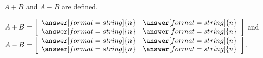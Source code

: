 \documentclass{ximera}
\begin{document}
\begin{exercise}
\begin{enumerate}
    $A+B$ and $A-B$ are  defined.

    $A + B = \startmat{rr}
      \answer[format=string]{n} & \answer[format=string]{n} \\
      \answer[format=string]{n} & \answer[format=string]{n}
    \stopmat$
    and $A - B = \startmat{rr}
      \answer[format=string]{n} & \answer[format=string]{n} \\
      \answer[format=string]{n} & \answer[format=string]{n}
    \stopmat$.

  \end{enumerate}

\end{exercise}
\end{document}
